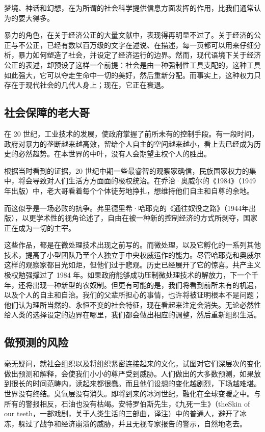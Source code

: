 梦境、神话和幻想，在为所谓的社会科学提供信息方面发挥的作用，比我们通常认为的要大得多。


暴力的角色，在关于经济公正的大量文献中，表现得再明显不过了。关于经济的公正与不公正，已经有数以百万级的文字在述说、在描述，每一页都可以用来仔细分析，暴力如何塑造了社会，并设定了经济运行的边界。然而，现代语境下关于经济公正的表述，却预设了这样一个前提：社会是由一种强制性工具支配的，这种工具如此强大，它可以夺走生命中一切的美好，然后重新分配。而事实上，这种权力只存在于现代社会的几代人身上；现在，它正在衰退。


\subsection{社会保障的老大哥}
在 20 世纪，工业技术的发展，使政府掌握了前所未有的控制手段。有一段时间，政府对暴力的垄断越来越高效，留给个人自主的空间越来越小，看上去已经成为历史的必然趋势。在本世界的中叶，没有人会期望主权个人的胜出。


根据当时看到的证据，20 世纪中期一些最睿智的观察家确信，民族国家权力的集中，将会导致对人们生活方方面面的极权统治。在乔治·奥威尔的《1984》（1949年出版）中，老大哥看着每个个体徒劳地挣扎，想维持他们自主和自尊的余地。


而这似乎是一场必败的抗争。弗里德里希·哈耶克的《通往奴役之路》（1944年出版），以更学术性的视角论述了，自由在被一种新的控制经济的方式所剥夺，国家正在成为一切的主宰。


这些作品，都是在微处理技术出现之前写的。而微处理，以及它孵化的一系列其他技术，提高了小型团队乃至个人独立于中央权威运作的能力。尽管哈耶克和奥威尔这样的观察家都目光如炬，但他们过于悲观。历史已经展开了它的惊喜。共产主义极权勉强撑过了 1984 年。如果政府能够成功压制微处理技术的解放力，下一个千年，还将出现一种新型的农奴制。但更有可能的是，我们将看到前所未有的机遇，以及个人的自主和自治。我们的父辈所担心的事情，也许将被证明根本不是问题；他们认为理所当然的、永恒不变的社会特征，现在看起来注定会消失。无论必然性给人类的选择设定的边界在哪里，我们都会做出相应的调整，然后重新组织生活。


\subsection{做预测的风险}
毫无疑问，就社会组织以及将组织紧密连接起来的文化，试图对它们深层次的变化做出预测和解释，会使我们小小的尊严受到威胁。人们做出的大多数预测，如果放到很长的时间范畴内，读起来都很蠢。而且他们设想的变化越剧烈，下场越难堪。世界没有终结。臭氧层没有消失。即将到来的冰河世纪，融化在全球变暖之中。与所有的警报相反，石油也没有枯竭。安特罗伯斯先生，《九死一生》（theSkin of our teeth，一部戏剧，关于人类生活的三部曲，译注）中的普通人，避开了冰冻，躲过了战争和经济崩溃的威胁，并且无视专家报告的警示，自然地老去。


